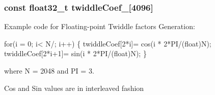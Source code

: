 \subsubsection[{\texorpdfstring{twiddle\+Coef\+\_\+2048}{twiddleCoef_2048}}]{\setlength{\rightskip}{0pt plus 5cm}const float32\+\_\+t twiddle\+Coef\+\_\mbox{[}4096\mbox{]}}\hypertarget{group__CFFT__CIFFT_ga23e7f30421a7905b21c2015429779633}{}\label{group__CFFT__CIFFT_ga23e7f30421a7905b21c2015429779633}
\begin{DoxyParagraph}{}
Example code for Floating-\/point Twiddle factors Generation\+: 
\end{DoxyParagraph}
\begin{DoxyParagraph}{}

\begin{DoxyPre}for(i = 0; i< N/; i++)
\{
  twiddleCoef[2*i]= cos(i * 2*PI/(float)N);
  twiddleCoef[2*i+1]= sin(i * 2*PI/(float)N);
\} \end{DoxyPre}
 
\end{DoxyParagraph}
\begin{DoxyParagraph}{}
where N = 2048 and PI = 3. 
\end{DoxyParagraph}
\begin{DoxyParagraph}{}
Cos and Sin values are in interleaved fashion 
\end{DoxyParagraph}

